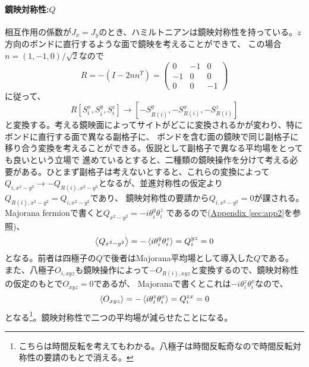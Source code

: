 \documentclass[11pt, aps, longbibliography]{article}
\begin{document}
        \paragraph{鏡映対称性:$Q$}
        相互作用の係数が$J_x=J_y$のとき、ハミルトニアンは鏡映対称性を持っている。$z$方向のボンドに直行するような面で鏡映を考えることができて、
        この場合$n=(1,-1,0)/\sqrt{2}$なので
        \begin{equation}\label{eq:SO6Majorana-15}
            R = -(I-2nn^T) = \begin{pmatrix}
                0 & -1 & 0 \\ -1 & 0 & 0 \\0 & 0 & -1
            \end{pmatrix}
        \end{equation}
        に従って、
        \begin{equation}\label{eq:SO6Majorana-16}
            R[S_i^x, S_i^y, S_i^z] \rightarrow [-S_{R(i)}^y, -S_{R(i)}^x, -S_{R(i)}^z]
        \end{equation}
        と変換する。考える鏡映面によってサイトがどこに変換されるかが変わり、特にボンドに直行する面で異なる副格子に、
        ボンドを含む面の鏡映で同じ副格子に移り合う変換を考えることができる。仮説として副格子で異なる平均場をとっても良いという立場で
        進めているとすると、二種類の鏡映操作を分けて考える必要がある。ひとまず副格子は考えないとすると、これらの変換によって
        $Q_{i,x^2-y^2} \rightarrow -Q_{R(i),x^2-y^2}$となるが、並進対称性の仮定より$Q_{R(i),x^2-y^2} = Q_{i,x^2-y^2}$であり、
        鏡映対称性の要請から$Q_{i,x^2-y^2}=0$が課される。Majorana fermionで書くと$Q_{x^2-y^2}=-i\theta_i^y\theta_i^z$
        であるので(\hyperlink{app_Majorana-mf}{Appendix \ref{sec:app2}}を参照)、
        \begin{equation}\label{eq:SO6Majorana-17}
            \expval{Q_{x^2-y^2}} = -\expval{i\theta_i^y\theta_i^z} = Q_{i}^{yz} = 0
        \end{equation}
        となる。前者は四極子の$Q$で後者はMajorana平均場として導入した$Q$である。
        また、八極子$O_{i,xyz}$も鏡映操作によって$-O_{R(i),xyz}$と変換するので、鏡映対称性の仮定のもとで$O_{xyz}=0$であるが、
        Majoranaで書くとこれは$-i\theta_i^z\theta_i^x$なので、
        \begin{equation}\label{eq:SO6Majorana-18}
            \expval{O_{xyz}} = -\expval{i\theta_i^z\theta_i^x} = Q_{i}^{zx} = 0
        \end{equation}
        となる\footnote{こちらは時間反転を考えてもわかる。八極子は時間反転奇なので時間反転対称性の要請のもとで消える。}。鏡映対称性で二つの平均場が減らせたことになる。
\end{document}
